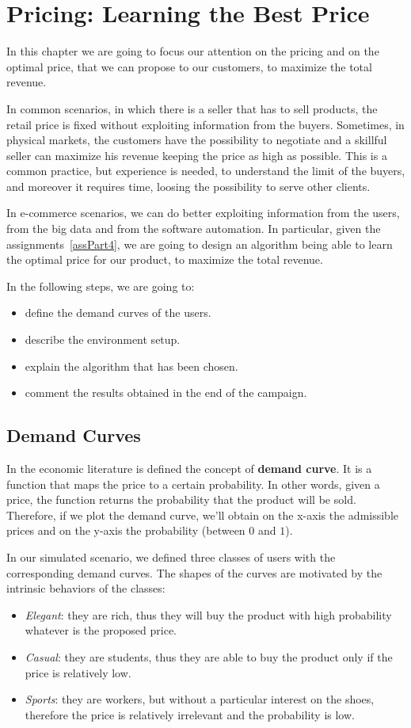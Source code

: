 \chapter{Pricing: Learning the Best Price}

In this chapter we are going to focus our attention on the pricing and on the optimal price, that we can propose to our customers, to maximize the total revenue.

In common scenarios, in which there is a seller that has to sell products, the retail price is fixed without exploiting information from the buyers.
Sometimes, in physical markets, the customers have the possibility to negotiate and a skillful seller can maximize his revenue keeping the price as high as possible. This is a common practice, but experience is needed, to understand the limit of the buyers, and moreover it requires time, loosing the possibility to serve other clients.

In e-commerce scenarios, we can do better exploiting information from the users, from the big data and from the software automation.
In particular, given the assignments~\ref{assPart4}, we are going to design an algorithm being able to learn the optimal price for our product, to maximize the total revenue.

In the following steps, we are going to:
\begin{itemize}
	\item define the demand curves of the users.
	\item describe the environment setup.
	\item explain the algorithm that has been chosen.
	\item comment the results obtained in the end of the campaign.
\end{itemize}


\section{Demand Curves}

In the economic literature is defined the concept of \textbf{demand curve}.
It is a function that maps the price to a certain probability. In other words, given a price, the function returns the probability that the product will be sold. Therefore, if we plot the demand curve, we'll obtain on the x-axis the admissible prices and on the y-axis the probability (between $0$ and $1$).

In our simulated scenario, we defined three classes of users with the corresponding demand curves. The shapes of the curves are motivated by the intrinsic behaviors of the classes:
\begin{itemize}
	\item \textit{Elegant}: they are rich, thus they will buy the product with high probability whatever is the proposed price.
	\item \textit{Casual}: they are students, thus they are able to buy the product only if the price is relatively low.
	\item \textit{Sports}: they are workers, but without a particular interest on the shoes, therefore the price is relatively irrelevant and the probability is low.
\end{itemize}

